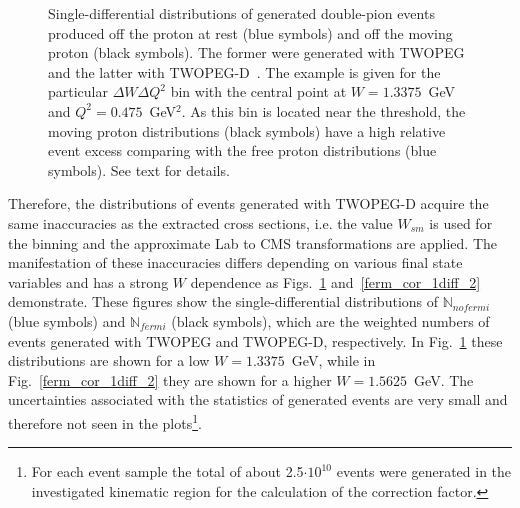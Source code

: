 \begin{figure}[htp]
\begin{center}
\caption{\small Single-differential distributions of generated double-pion events produced off the proton at rest (blue symbols) and off the moving proton (black symbols). The former were generated with TWOPEG~\cite{twopeg} and the latter with TWOPEG-D~\cite{twopeg-d}. The example is given for the particular $\Delta W \Delta Q^{2}$ bin with the central point at $W=1.3375$~GeV and $Q^{2}=0.475$~GeV$^{2}$. As this bin is located near the threshold, the moving proton distributions (black symbols) have a high relative event excess comparing with the free proton distributions (blue symbols). See text for details. } \label{ferm_cor_1diff_1}
\end{center}
\end{figure}

Therefore, the distributions of events generated with TWOPEG-D acquire the same inaccuracies as the extracted cross sections, i.e. the value $W_{sm}$ is used for the binning and the approximate Lab to CMS transformations are applied. The manifestation of these inaccuracies differs depending on various final state variables and has a strong $W$ dependence as Figs.~\ref{ferm_cor_1diff_1} and~\ref{ferm_cor_1diff_2} demonstrate. These figures show the single-differential distributions of $\mathbb{N}_{nofermi}$ (blue symbols) and $\mathbb{N}_{fermi}$ (black symbols), which are the weighted numbers of events generated with TWOPEG and TWOPEG-D, respectively. In Fig.~\ref{ferm_cor_1diff_1} these distributions are shown for a low $W = 1.3375$~GeV, while in Fig.~\ref{ferm_cor_1diff_2} they are shown for a higher $W=1.5625$~GeV. The uncertainties associated with the statistics of generated events are very small and therefore not seen in the plots\footnote[4]{For each event sample the total of about 2.5$\cdot 10^{10}$ events were generated in the investigated kinematic region for the calculation of the correction factor.}.

